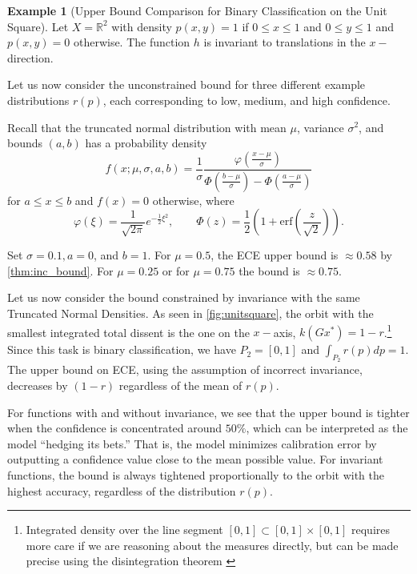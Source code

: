 \documentclass[10pt]{article} %
\theoremstyle{definition}
\newtheorem{example}{Example}
\begin{document}
\begin{example}[Upper Bound Comparison for Binary Classification on the Unit Square] \label{ex:comparison} Let $ X = \mathbb{R}^2$ with density $p(x,y) = 1$ if $0 \leq x \leq 1$ and $0 \leq y \leq 1$ and $p(x,y) = 0$ otherwise. The function $h$ is invariant to translations in the $x-$direction.  

Let us now consider the unconstrained bound for three different example distributions $r(p)$, each corresponding to low, medium, and high confidence. 

Recall that the truncated normal distribution with mean $\mu$, variance $\sigma^2$, and bounds $(a,b)$ has a probability density
\begin{equation*}
f(x; \mu, \sigma, a,b) = \frac{1}{\sigma}\frac{\varphi\left(\frac{x - \mu}{\sigma}\right)}{\Phi\left(\frac{b - \mu}{\sigma}\right) - \Phi\left(\frac{a - \mu}{\sigma}\right)}
\end{equation*}
for $ a \leq x \leq b$ and $f(x) = 0$ otherwise, where 
\begin{equation*}
 \varphi(\xi) = \frac{1}{\sqrt{2\pi}}e^{-\frac{1}{2}\xi ^2},   \qquad \Phi(z) = \frac{1}{2}\left(1+\text{erf} \left(\frac{z}{\sqrt{2}}\right)\right)  .
\end{equation*}

Set $\sigma = 0.1, a = 0$, and $b=1$. For $\mu = 0.5$, the ECE upper bound is $\approx 0.58$ by \cref{thm:inc_bound}. For $\mu = 0.25$ or for $\mu = 0.75$ the bound is $\approx 0.75$.

Let us now consider the bound constrained by invariance with the same Truncated Normal Densities. As seen in \cref{fig:unitsquare}, the orbit with the smallest integrated total dissent is the one on the $x-$axis, $k(Gx^*) = 1-r$.\footnote{Integrated density over the line segment $[0,1] \subset [0,1] \times [0,1]$ requires more care if we are reasoning about the measures directly, but can be made precise using the disintegration theorem \citep{pachl1978disintegration}} Since this task is binary classification, we have $P_2 = [0,1]$ and $\int_{P_2}r(p)dp = 1$. The upper bound on ECE, using the assumption of incorrect invariance, decreases by $(1 - r)$ regardless of the mean of $r(p)$. 

For functions with and without invariance, we see that the upper bound is tighter when the confidence is concentrated around $50\%$, which can be interpreted as the model ``hedging its bets.'' That is, the model minimizes calibration error by outputting a confidence value close to the mean possible value. For invariant functions, the bound is always tightened proportionally to the orbit with the highest accuracy, regardless of the distribution $r(p)$. 
\end{example}
\end{document}
